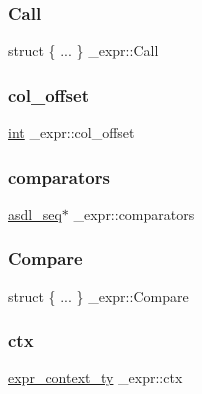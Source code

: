 \mbox{\label{struct__expr_ad5115ed3c017a6e093c315f1beb621d4}} 
\subsubsection{\texorpdfstring{Call}{Call}}
{\footnotesize\ttfamily struct \{ ... \}   \+\_\+expr\+::\+Call}

\mbox{\label{struct__expr_a9e8fb71f839ec6124be14f3aeec7d721}} 
\subsubsection{\texorpdfstring{col\_offset}{col\_offset}}
{\footnotesize\ttfamily \mbox{\hyperlink{warnings_8h_a74f207b5aa4ba51c3a2ad59b219a423b}{int}} \+\_\+expr\+::col\+\_\+offset}

\mbox{\label{struct__expr_a775db492c1dc66a8f570976a4bf8927d}} 
\subsubsection{\texorpdfstring{comparators}{comparators}}
{\footnotesize\ttfamily \mbox{\hyperlink{structasdl__seq}{asdl\+\_\+seq}}$\ast$ \+\_\+expr\+::comparators}

\mbox{\label{struct__expr_a38716811a5cef610e36de18202f458ba}} 
\subsubsection{\texorpdfstring{Compare}{Compare}}
{\footnotesize\ttfamily struct \{ ... \}   \+\_\+expr\+::\+Compare}

\mbox{\label{struct__expr_a688663a3816864e9c5f400075663f475}} 
\subsubsection{\texorpdfstring{ctx}{ctx}}
{\footnotesize\ttfamily \mbox{\hyperlink{_python-ast_8h_a38710ce394ed6d5cc8ebe79a322dcdf9}{expr\+\_\+context\+\_\+ty}} \+\_\+expr\+::ctx}

